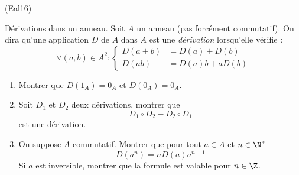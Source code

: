 \begin{tiny}(Eal16)\end{tiny} Dérivations dans un anneau.\newline
Soit $A$ un anneau (pas forcément commutatif). On dira qu'une application $D$ de $A$ dans $A$ est une \emph{dérivation} lorsqu'elle vérifie :
\begin{displaymath}
\forall (a,b)\in A^2:
\left\lbrace
\begin{aligned}
 D(a+b) &= D(a)+D(b)\\
 D(ab) &= D(a)b+aD(b)
\end{aligned}
\right. 
\end{displaymath}
\begin{enumerate}
 \item Montrer que $D(1_A)=0_A$ et $D(0_A)=0_A$.
 \item Soit $D_1$ et $D_2$ deux dérivations, montrer que $$D_1\circ D_2 - D_2\circ D_1$$ est une dérivation.
 \item On suppose $A$ commutatif. Montrer que pour tout $a\in A$ et $n\in \N^*$
\begin{displaymath}
 D(a^n)=nD(a)a^{n-1}
\end{displaymath}
Si $a$ est inversible, montrer que la formule est valable pour $n\in \Z$.
\end{enumerate}

